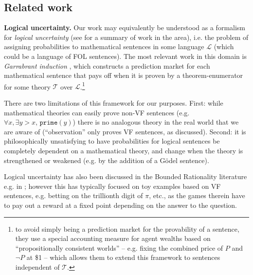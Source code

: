 \subsection{Related work}
\label{nonvf:sec:related}

\textbf{Logical uncertainty.} Our work may equivalently be understood as a formalism for \emph{logical uncertainty} (see \citep{halpernReasoningUncertaintySecond2017} for a summary of work in the area), i.e. the problem of assigning probabilities to mathematical sentences in some language $\mathcal{L}$ (which could be a language of FOL sentences). The most relevant work in this domain is \emph{Garrabrant induction} \citep{garrabrantLogicalInduction2020}, which constructs a prediction market for each mathematical sentence that pays off when it is proven by a theorem-enumerator for some theory $\mathcal{T}$ over $\mathcal{L}$.\footnote{to avoid simply being a prediction market for the provability of a sentence, they use a special accounting measure for agent wealths based on ``propositionally consistent worlds'' -- e.g. fixing the combined price of $P$ and $\lnot P$ at \$1 -- which allows them to extend this framework to sentences independent of $\mathcal{T}$.} 

There are two limitations of this framework for our purposes. First: while mathematical theories can easily prove non-VF sentences (e.g. $\forall x,\exists y>x,\,\texttt{prime}(y)$) there is no analogous theory in the real world that we are aware of (``observation'' only proves VF sentences, as discussed). Second: it is philosophically unsatisfying to have probabilities for logical sentences be completely dependent on a mathematical theory, and change when the theory is strengthened or weakened (e.g. by the addition of a G\"odel sentence).

Logical uncertainty has also been discussed in the Bounded Rationality literature e.g. in \citet{halpernAlgorithmicRationalityGame2014,halpernDontWantThink2011,oesterheldTheoryBoundedInductive2023}; however this has typically focused on toy examples based on VF sentences, e.g. betting on the trillionth digit of $\pi$, etc., %
as the games therein have to pay out a reward at a fixed point depending on the answer to the question.


